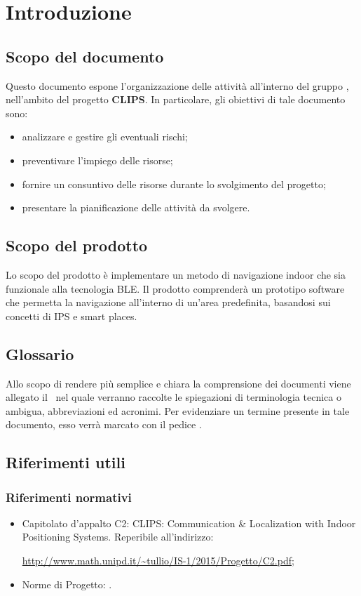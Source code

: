 \documentclass[../PianoProgetto.tex]{subfiles}
\begin{document}
\section{Introduzione}
	\subsection{Scopo del documento}
	Questo documento espone l'organizzazione delle attività all'interno del gruppo \leaf, nell'ambito del progetto \textbf{CLIPS}.
In particolare, gli obiettivi di tale documento sono:
	\begin{itemize}
	\item analizzare e gestire gli eventuali rischi;
	\item preventivare l'impiego delle risorse;
	\item fornire un consuntivo delle risorse durante lo svolgimento del progetto;
	\item presentare la pianificazione delle attività da svolgere.
	\end{itemize}
	
	\subsection{Scopo del prodotto}
	Lo scopo del prodotto è implementare un metodo di navigazione indoor che sia funzionale alla tecnologia BLE.
	Il prodotto comprenderà un prototipo software che permetta la navigazione all’interno di un’area predefinita, basandosi sui concetti di IPS e smart places.

	\subsection{Glossario}
		Allo scopo di rendere più semplice e chiara la comprensione dei documenti
viene allegato il \glossariov\ nel quale verranno raccolte le spiegazioni di
terminologia tecnica o ambigua, abbreviazioni ed acronimi. Per evidenziare
un termine presente in tale documento, esso verrà marcato con il pedice \g.


	\subsection{Riferimenti utili}

		\subsubsection{Riferimenti normativi}
		\begin{itemize}
		\item Capitolato d'appalto C2: CLIPS: Communication \& Localization with Indoor Positioning Systems. Reperibile all'indirizzo: \par
			\url{http://www.math.unipd.it/~tullio/IS-1/2015/Progetto/C2.pdf};
		\item Norme di Progetto: \normediprogettov.
		\end{itemize}
\end{document}
